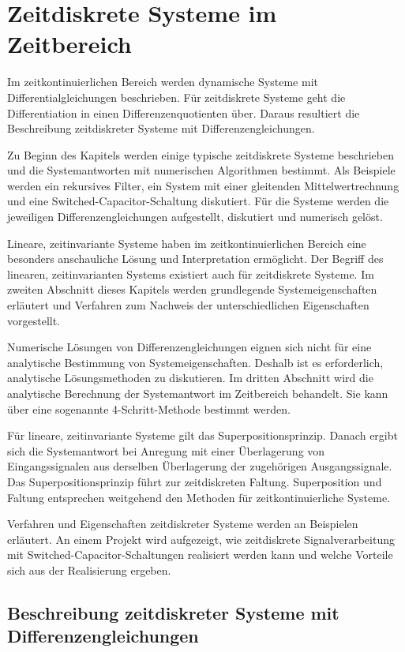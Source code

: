 \chapter{Zeitdiskrete Systeme im Zeitbereich}\label{sec:zeitdiskrete-systeme-im-zeitbereich}

Im zeitkontinuierlichen Bereich werden dynamische Systeme mit Differentialgleichungen beschrieben. Für zeitdiskrete Systeme geht die Differentiation in einen Differenzenquotienten über. Daraus resultiert die Beschreibung zeitdiskreter Systeme mit Differenzengleichungen.

Zu Beginn des Kapitels werden einige typische zeitdiskrete Systeme beschrieben und die Systemantworten mit numerischen Algorithmen bestimmt. Als Beispiele werden ein rekursives Filter, ein System mit einer gleitenden Mittelwertrechnung und eine Switched-Capacitor-Schaltung diskutiert. Für die Systeme werden die jeweiligen Differenzengleichungen aufgestellt, diskutiert und numerisch gelöst.

Lineare, zeitinvariante Systeme haben im zeitkontinuierlichen Bereich eine besonders anschauliche Lösung und Interpretation ermöglicht. Der Begriff des linearen, zeitinvarianten Systems existiert auch für zeitdiskrete Systeme. Im zweiten Abschnitt dieses Kapitels werden grundlegende Systemeigenschaften erläutert und Verfahren zum Nachweis der unterschiedlichen Eigenschaften vorgestellt.

Numerische Lösungen von Differenzengleichungen eignen sich nicht für eine analytische Bestimmung von Systemeigenschaften. Deshalb ist es erforderlich, analytische Lösungsmethoden zu diskutieren. Im dritten Abschnitt wird die analytische Berechnung der Systemantwort im Zeitbereich behandelt. Sie kann über eine sogenannte 4-Schritt-Methode bestimmt werden.

Für lineare, zeitinvariante Systeme gilt das Superpositionsprinzip. Danach ergibt sich die Systemantwort bei Anregung mit einer Überlagerung von Eingangssignalen aus derselben Überlagerung der zugehörigen Ausgangssignale. Das Superpositionsprinzip führt zur zeitdiskreten Faltung. Superposition und Faltung entsprechen weitgehend den Methoden für zeitkontinuierliche Systeme.

Verfahren und Eigenschaften zeitdiskreter Systeme werden an Beispielen erläutert. An einem Projekt wird aufgezeigt, wie zeitdiskrete Signalverarbeitung mit Switched-Capacitor-Schaltungen realisiert werden kann und welche Vorteile sich aus der Realisierung ergeben.

\section{Beschreibung zeitdiskreter Systeme mit Differenzengleichungen}\label{sec:4.1}


